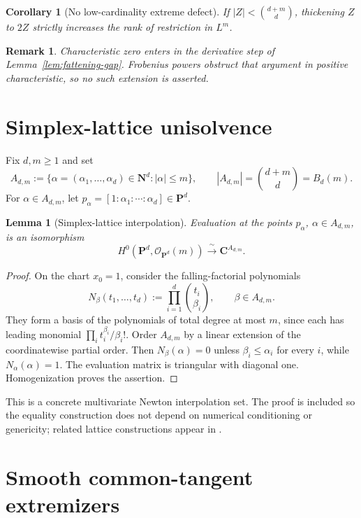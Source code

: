 \documentclass[11pt]{article}
\newtheorem{lemma}[theorem]{Lemma}
\newtheorem{corollary}[theorem]{Corollary}
\newtheorem{remark}[theorem]{Remark}
\newcommand{\PP}{\mathbf P}
\newcommand{\CC}{\mathbf C}
\newcommand{\NN}{\mathbf N}
\newcommand{\cO}{\mathcal O}
\newcommand{\BZ}{B_d(m)}
\begin{document}
\begin{corollary}[No low-cardinality extreme defect]
If $|Z|<\binom{d+m}{d}$, thickening $Z$ to $2Z$ strictly increases the rank
of restriction in $L^m$.
\end{corollary}

\begin{remark}
Characteristic zero enters in the derivative step of
Lemma~\ref{lem:fattening-gap}.  Frobenius powers obstruct that argument in
positive characteristic, so no such extension is asserted.
\end{remark}

\section{Simplex-lattice unisolvence}\label{sec:unisolvence}

Fix $d,m\geq1$ and set
\[
 A_{d,m}:=\{\alpha=(\alpha_1,\ldots,\alpha_d)\in\NN^d:|\alpha|\leq m\},
 \qquad |A_{d,m}|=\binom{d+m}{d}=\BZ.
\]
For $\alpha\in A_{d,m}$, let
$p_\alpha=[1:\alpha_1:\cdots:\alpha_d]\in\PP^d$.

\begin{lemma}[Simplex-lattice interpolation]\label{lem:unisolvent}
Evaluation at the points $p_\alpha$, $\alpha\in A_{d,m}$, is an isomorphism
\[
 H^0(\PP^d,\cO_{\PP^d}(m))\xrightarrow{\ \sim\ }\CC^{A_{d,m}}.
\]
\end{lemma}

\begin{proof}
On the chart $x_0=1$, consider the falling-factorial polynomials
\[
 N_\beta(t_1,\ldots,t_d):=\prod_{i=1}^d\binom{t_i}{\beta_i},
 \qquad \beta\in A_{d,m}.
\]
They form a basis of the polynomials of total degree at most $m$, since each
has leading monomial $\prod_i t_i^{\beta_i}/\beta_i!$.  Order $A_{d,m}$ by a
linear extension of the coordinatewise partial order.  Then
$N_\beta(\alpha)=0$ unless $\beta_i\leq\alpha_i$ for every $i$, while
$N_\alpha(\alpha)=1$.  The evaluation matrix is triangular with diagonal
one.  Homogenization proves the assertion.
\end{proof}

This is a concrete multivariate Newton interpolation set.  The proof is
included so the equality construction does not depend on numerical
conditioning or genericity; related lattice constructions appear in
\cite{ChungYao1977,LeePhillips1991}.

\section{Smooth common-tangent extremizers}\label{sec:extremizers}
\end{document}
